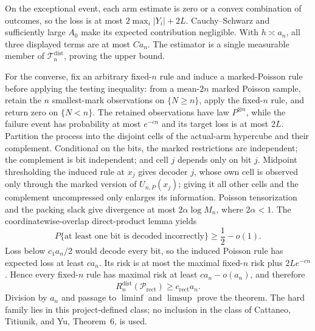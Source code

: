On the exceptional event, each arm estimate is zero or a convex combination of outcomes, so the loss is at most \(2\max_i|Y_i|+2L\).  Cauchy--Schwarz and sufficiently large \(A_0\) make its expected contribution negligible.  With \(h\asymp a_n\), all three displayed terms are at most \(Ca_n\).  The estimator is a single measurable member of \(\mathcal T_n^{\mathrm{dist}}\), proving the upper bound.

For the converse, fix an arbitrary fixed-\(n\) rule and induce a marked-Poisson rule before applying the testing inequality: from a mean-\(2n\) marked Poisson sample, retain the \(n\) smallest-mark observations on \(\{N\geq n\}\), apply the fixed-\(n\) rule, and return zero on \(\{N<n\}\).  The retained observations have law \(P^{\otimes n}\), while the failure event has probability at most \(e^{-c n}\) and its target loss is at most \(2L\).  Partition the process into the disjoint cells of the actual-arm hypercube and their complement.  Conditional on the bits, the marked restrictions are independent; the complement is bit independent; and cell \(j\) depends only on bit \(j\).  Midpoint thresholding the induced rule at \(x_j\) gives decoder \(j\), whose own cell is observed only through the marked version of \(U_{n,P}(x_j)\); giving it all other cells and the complement uncompressed only enlarges its information.  Poisson tensorization and the packing slack give divergence at most \(2\alpha\log M_n\), where \(2\alpha<1\).  The coordinatewise-overlap direct-product lemma yields
\[
 P\{\text{at least one bit is decoded incorrectly}\}\geq\frac12-o(1).
\]
Loss below \(c_1a_n/2\) would decode every bit, so the induced Poisson rule has expected loss at least \(ca_n\).  Its risk is at most the maximal fixed-\(n\) risk plus \(2Le^{-cn}\).  Hence every fixed-\(n\) rule has maximal risk at least \(ca_n-o(a_n)\), and therefore
\[
 R_n^{\mathrm{dist}}(\mathcal P_{\mathrm{rect}})\geq c_{\mathrm{rect}}a_n.
\]
Division by \(a_n\) and passage to \(\liminf\) and \(\limsup\) prove the theorem.  The hard family lies in this project-defined class; no inclusion in the class of Cattaneo, Titiunik, and Yu, Theorem~6, is used.